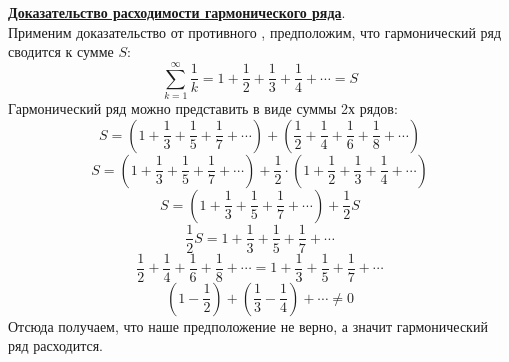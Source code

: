 \documentclass{report}
\begin{document}
\textbf{\uline{Доказательство расходимости гармонического ряда}}.\\
Применим доказательство от противного , предположим, что гармонический ряд сводится к сумме $S$:
$$\sum\limits_{k = 1}^\infty \frac{1}{k} = 1 + \frac{1}{2} + \frac{1}{3} + \frac{1}{4} + \cdots = S$$
Гармонический ряд можно представить в виде суммы 2х рядов:
$$S = (1 + \frac{1}{3} + \frac{1}{5} + \frac{1}{7} + \cdots) + (\frac{1}{2} + \frac{1}{4} + \frac{1}{6} + \frac{1}{8} + \cdots)$$
$$S = (1 + \frac{1}{3} + \frac{1}{5} + \frac{1}{7} + \cdots) + \frac{1}{2} \cdot (1 + \frac{1}{2} + \frac{1}{3} + \frac{1}{4} + \cdots)$$
$$S = (1 + \frac{1}{3} + \frac{1}{5} + \frac{1}{7} + \cdots) + \frac{1}{2}S$$
$$\frac{1}{2}S = 1 + \frac{1}{3} + \frac{1}{5} + \frac{1}{7} + \cdots$$
$$\frac{1}{2} + \frac{1}{4} + \frac{1}{6} + \frac{1}{8} + \cdots = 1 + \frac{1}{3} + \frac{1}{5} + \frac{1}{7} + \cdots$$
$$(1 - \frac{1}{2}) + (\frac{1}{3} - \frac{1}{4}) + \cdots \ne 0$$
Отсюда получаем, что наше предположение не верно, а значит гармонический ряд расходится.
\end{document}
